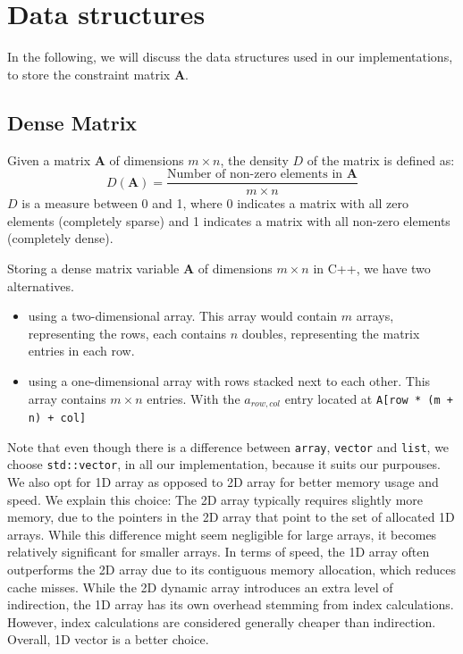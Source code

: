 \section{Data structures}
In the following, we will discuss the data structures used in our implementations, to store the constraint matrix $\mathbf{A}$.
\subsection{Dense Matrix}
Given a matrix $\mathbf{A}$ of dimensions \( m \times n \), the density \( D \) of
the matrix is defined as:
\[
    D(\mathbf{A}) = \frac{\text{Number of non-zero elements in } \mathbf{A}}{m \times n}
\]
$D$ is a measure between 0 and 1, where 0 indicates a
matrix with all zero elements (completely sparse)
and 1 indicates a matrix with all non-zero elements (completely dense).

Storing a dense matrix variable \( \mathbf{A} \) of dimensions \( m \times n \) in C++, we have two alternatives.
\begin{itemize}
    \item using a two-dimensional array. This array would contain
          $m$ arrays, representing the rows, each contains $n$ doubles, representing the matrix entries in each row.
    \item using a one-dimensional array with rows stacked next to each other.
          This array contains $m \times n$ entries.
          With the $a_{row,col}$ entry located at \texttt{A[row * (m + n) + col]}
\end{itemize}
Note that even
though there is a difference between  \texttt{array}, \texttt{vector} and \texttt{list}, we
choose \texttt{std::vector}, in all our implementation, because it suits our purpouses.
We also opt for 1D array as opposed to 2D array for better memory usage and speed.
We explain this choice:
The 2D array typically requires slightly more memory, due to the pointers in the 2D array that point to
the set of allocated 1D arrays. While this difference might seem negligible for large arrays,
it becomes relatively significant for smaller arrays.
In terms of speed, the 1D array often outperforms
the 2D array due to its contiguous memory allocation, which reduces cache misses.
While the 2D dynamic array introduces an
extra level of indirection, the 1D array has its own overhead stemming from index calculations.
However, index calculations are considered generally cheaper than indirection.
Overall, 1D vector is a better choice.

